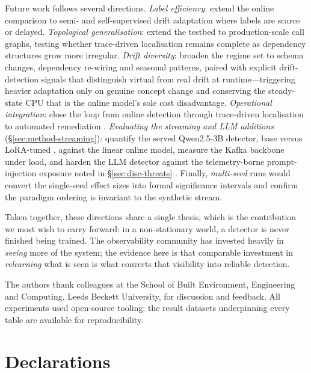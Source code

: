 \documentclass[pdflatex,sn-mathphys-num]{sn-jnl}%
\theoremstyle{thmstyleone}%
\theoremstyle{thmstyletwo}%
\theoremstyle{thmstylethree}%
\begin{document}
Future work follows several directions. \emph{Label efficiency}: extend the online comparison to semi- and self-supervised drift adaptation where labels are scarce or delayed. \emph{Topological generalisation}: extend the testbed to production-scale call graphs, testing whether trace-driven localisation remains complete as dependency structures grow more irregular. \emph{Drift diversity}: broaden the regime set to schema changes, dependency re-wiring and seasonal patterns, paired with explicit drift-detection signals that distinguish virtual from real drift at runtime---triggering heavier adaptation only on genuine concept change and conserving the steady-state CPU that is the online model's sole cost disadvantage. \emph{Operational integration}: close the loop from online detection through trace-driven localisation to automated remediation \cite{pedroso2025,han2024}. \emph{Evaluating the streaming and LLM additions} (\S\ref{sec:method-streaming}): quantify the served Qwen2.5-3B detector, base versus LoRA-tuned \cite{hu2022lora}, against the linear online model, measure the Kafka backbone under load, and harden the LLM detector against the telemetry-borne prompt-injection exposure noted in \S\ref{sec:disc-threats} \cite{greshake2023}. Finally, \emph{multi-seed} runs would convert the single-seed effect sizes into formal significance intervals and confirm the paradigm ordering is invariant to the synthetic stream.

Taken together, these directions share a single thesis, which is the contribution we most wish to carry forward: in a non-stationary world, a detector is never finished being trained. The observability community has invested heavily in \emph{seeing} more of the system; the evidence here is that comparable investment in \emph{relearning} what is seen is what converts that visibility into reliable detection.

\backmatter

The authors thank colleagues at the School of Built Environment, Engineering and Computing, Leeds Beckett University, for discussion and feedback. All experiments used open-source tooling; the result datasets underpinning every table are available for reproducibility.

\section*{Declarations}
\end{document}
